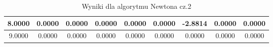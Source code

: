 \documentclass[a4paper, 11pt]{article}
\begin{document}
\begin{enumerate}
\begin{itemize}
\begin{table}
\begin{tabular}{|c|c|c|c|c|c|c|c|c|}
8.0000 & 0.0000 & 0.0000 & 0.0000 & 0.0000 & 0.0000 & -2.8814 & 0.0000 & 0.0000 \\       
\hline                                                                                   
9.0000 & 0.0000 & 0.0000 & 0.0000 & 0.0000 & 0.0000 & 0.0000 & 0.0000 & 0.0000 \\       
\hline                                                                                   
\end{tabular}    
 \caption{Wyniki dla algorytmu Newtona cz.2}                                                                                                                                                                                          
\label{table:Wyniki dla algorytmu Newtona}                                                                                                                                                                                        
\end{table}                                                                                                                                                                                                       
       

\end{itemize}
\end{enumerate}
\end{document}
